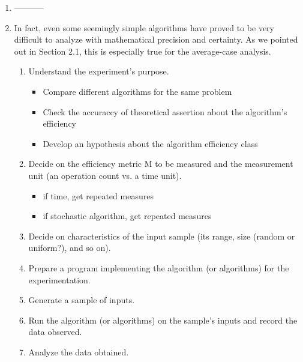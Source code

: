 \documentclass{article}
\begin{document}
\begin{enumerate}
\item -----------
\item In fact, even some seemingly simple algorithms have proved to be very difficult to analyze with mathematical precision and certainty. As we
pointed out in Section 2.1, this is especially true for the average-case analysis.
\begin{enumerate}
    \item Understand the experiment's purpose.
    \begin{itemize}
        \item Compare different algorithms for the same problem
        \item Check the accuraccy of theoretical assertion about the algorithm's efficiency
        \item Develop an hypothesis about the algorithm efficiency class
    \end{itemize}    
    \item Decide on the efficiency metric M to be measured and the measurement unit (an operation count vs. a time unit).
    \begin{itemize}
        \item if time, get repeated measures
        \item if stochastic algorithm, get repeated measures
    \end{itemize}
    \item Decide on characteristics of the input sample (its range, size (random or uniform?), and so on).
    \item Prepare a program implementing the algorithm (or algorithms) for the experimentation.
    \item Generate a sample of inputs.
    \item Run the algorithm (or algorithms) on the sample's inputs and record the data observed.
    \item Analyze the data obtained.
\end{enumerate}


\end{enumerate}
\end{document}
